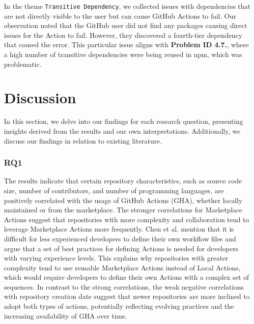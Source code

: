 \documentclass[conference]{IEEEtran}
\begin{document}
	In the theme \texttt{Transitive Dependency}, we collected issues with dependencies that are not directly visible to the user but can cause GitHub Actions to fail. Our observation noted that the GitHub user did not find any packages causing direct issues for the Action to fail. However, they discovered a fourth-tier dependency that caused the error. This particular issue aligns with \textbf{Problem ID 4.7.}, where a high number of transitive dependencies were being reused in npm, which was problematic\cite{hugomg22024}.
\section{Discussion}
	In this section, we delve into our findings for each research question, presenting insights derived from the results and our own interpretations. Additionally, we discuss our findings in relation to existing literature. \\

\subsubsection{\textbf{RQ1}} The results indicate that certain repository characteristics, such as source code size, number of contributors, and number of programming languages, are positively correlated with the usage of GitHub Actions (GHA), whether locally maintained or from the marketplace. The stronger correlations for Marketplace Actions suggest that repositories with more complexity and collaboration tend to leverage Marketplace Actions more frequently. Chen et al. \cite{chen2021supercharge} mention that it is difficult for less experienced developers to define their own workflow files and argue that a set of best practices for defining Actions is needed for developers with varying experience levels. This explains why repositories with greater complexity tend to use reusable Marketplace Actions instead of Local Actions, which would require developers to define their own Actions with a complex set of sequences. In contrast to the strong correlations, the weak negative correlations with repository creation date suggest that newer repositories are more inclined to adopt both types of actions, potentially reflecting evolving practices and the increasing availability of GHA over time.
\end{document}
